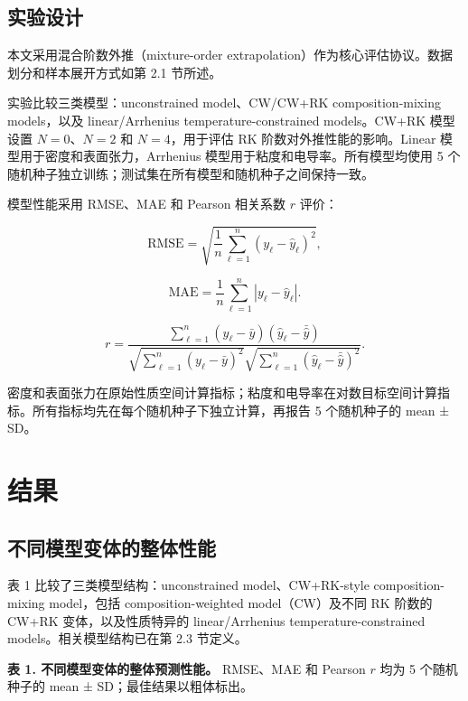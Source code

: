 \documentclass[journal=jctcce,manuscript=article,doi=true]{achemso}
\begin{document}
\subsection{实验设计}\label{ux5b9eux9a8cux8bbeux8ba1}

本文采用混合阶数外推（mixture-order extrapolation）作为核心评估协议。数据划分和样本展开方式如第 2.1 节所述。

实验比较三类模型：unconstrained model、CW/CW+RK composition-mixing models，以及 linear/Arrhenius temperature-constrained models。CW+RK 模型设置 \(N=0\)、\(N=2\) 和 \(N=4\)，用于评估 RK 阶数对外推性能的影响。Linear 模型用于密度和表面张力，Arrhenius 模型用于粘度和电导率。所有模型均使用 5 个随机种子独立训练；测试集在所有模型和随机种子之间保持一致。

模型性能采用 RMSE、MAE 和 Pearson 相关系数 \(r\) 评价：

\[
\mathrm{RMSE}
=
\sqrt{
\frac{1}{n}\sum_{\ell=1}^{n}(y_\ell-\hat{y}_\ell)^2
},
\tag{13}
\]

\[
\mathrm{MAE}
=
\frac{1}{n}\sum_{\ell=1}^{n}|y_\ell-\hat{y}_\ell|.
\tag{14}
\]

\[
r
=
\frac{
\sum_{\ell=1}^{n}(y_\ell-\bar{y})(\hat{y}_\ell-\bar{\hat{y}})
}{
\sqrt{\sum_{\ell=1}^{n}(y_\ell-\bar{y})^2}
\sqrt{\sum_{\ell=1}^{n}(\hat{y}_\ell-\bar{\hat{y}})^2}
}.
\tag{15}
\]

密度和表面张力在原始性质空间计算指标；粘度和电导率在对数目标空间计算指标。所有指标均先在每个随机种子下独立计算，再报告 5 个随机种子的 mean ± SD。

\section{结果}\label{ux7ed3ux679c}

\subsection{不同模型变体的整体性能}\label{ux4e0dux540cux6a21ux578bux53d8ux4f53ux7684ux6574ux4f53ux6027ux80fd}

表 1 比较了三类模型结构：unconstrained model、CW+RK-style composition-mixing model，包括 composition-weighted model（CW）及不同 RK 阶数的 CW+RK 变体，以及性质特异的 linear/Arrhenius temperature-constrained models。相关模型结构已在第 2.3 节定义。

\noindent\textbf{表 1. 不同模型变体的整体预测性能。} RMSE、MAE 和 Pearson \(r\) 均为 5 个随机种子的 mean ± SD；最佳结果以粗体标出。
\end{document}
